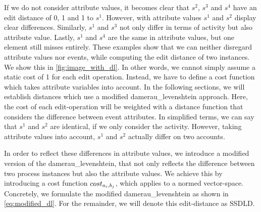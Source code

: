\documentclass[./../../paper.tex]{subfiles}
\begin{document}
\noindent If we do not consider attribute values, it becomes clear that $s^2$, $s^3$ and $s^4$ have an edit distance of 0, 1 and 1 to $s^1$. However, with attribute values $s^1$ and $s^2$ display clear differences. Similarly, $s^1$ and $s^3$ not only differ in terms of activity but also attribute value. Lastly, $s^1$ and $s^4$ are the same in attribute values, but one element still misses entirely. These examples show that we can neither disregard attribute values nor events, while computing the edit distance of two \glspl{instance}. We show this in \autoref{fig:image_with_dl}. In other words, we cannot simply assume a static cost of 1 for each edit operation. Instead, we have to define a cost function which takes attribute variables into account. In the following sections, we will establish distances which use a modified \gls{damerau_levenshtein} approach. Here, the cost of each edit-operation will be weighted with a distance function that considers the difference between event attributes. In simplified terms, we can say that $s^1$ and $s^2$ are identical, if we only consider the activity. However, taking attribute values into account, $s^1$ and $s^2$ actually differ on two accounts. 


\noindent In order to reflect these differences in attribute values, we introduce a modified version of the \gls{damerau_levenshtein}, that not only reflects the difference between two process instances but also the attribute values. We achieve this by introducing a cost function $cost_{a_i, b_j}$, which applies to a normed vector-space\footnotemark. Concretely, we formulate the modified \gls{damerau_levenshtein} as shown in \autoref{eq:modified_dl}. For the remainder, we will denote this edit-distance as \gls{SSDLD}.
\end{document}
